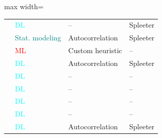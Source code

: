 \begin{table}[p]
\begin{adjustbox}{max width=\textwidth}
\begin{tabular}{l p{2.2cm} p{3.8cm} p{2.7cm}}
\citep{shah-raga_recognition} & \textcolor{cyan}{DL} & -- & Spleeter \\
\citep{shikarpur-raga_classification} & \textcolor{teal}{Stat. modeling} & Autocorrelation & Spleeter \\ %
\citep{vasudevan-hybrid_raga} & \textcolor{red}{ML} & Custom heuristic & -- \\
\citep{clayton-raga_classification} & \textcolor{cyan}{DL} & Autocorrelation & Spleeter \\
\citep{vishnu-lstm_raga} & \textcolor{cyan}{DL} & -- & -- \\
\citep{basu-raga} & \textcolor{cyan}{DL} & -- & -- \\
\citep{jayanthi-raga} & \textcolor{cyan}{DL} & -- & -- \\
\citep{jayanthi-raga} & \textcolor{cyan}{DL} & -- & -- \\
\citep{roychowdhury-raga} & \textcolor{cyan}{DL} & Autocorrelation & Spleeter \\
\bottomrule
\end{tabular}
\end{adjustbox}
\vfill\clearpage
\end{table}
